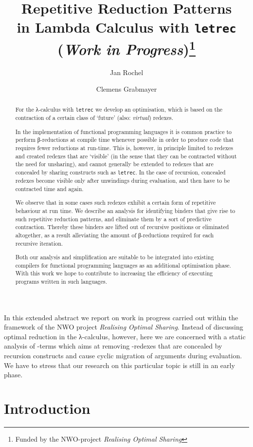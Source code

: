 \documentclass[submission,copyright,creativecommons]{eptcs}
\title{Repetitive Reduction Patterns\\ in Lambda Calculus with {\tt letrec}\\
       ({\it Work in Progress})\thanks{Funded by the NWO-project \emph{Realising Optimal Sharing}}}
\author{
  Jan Rochel
    \institute{Utrecht University\\ Utrecht, The Netherlands}
    \institute{Department of Information and Computing Sciences\\
               Information and Software Systems}
    \email{J.Rochel@cs.uu.nl}
\and
  Clemens Grabmayer
    \institute{Utrecht University\\Utrecht, The Netherlands}
    \institute{Department of Philosophy\\
               Theoretical Philosophy}
    \email{Clemens.Grabmayer@phil.uu.nl}
}
\newcommand{\nbd}{\nobreakdash}
\renewcommand\;{\,}
\begin{document}
\maketitle

\begin{abstract}
For the λ-calculus with \texttt{letrec} we develop an optimisation, which
is based on the contraction of a certain class of `future' (also: \emph{virtual})
redexes.

In the implementation of functional programming languages it is common practice
to perform β\nbd-reductions at compile time whenever possible in order to produce
code that requires fewer reductions at run-time. This is, however, in principle
limited to redexes and created redexes that are `visible' (in the sense that
they can be contracted without the need for unsharing), and cannot generally be
extended to redexes that are concealed by sharing constructs such as
\texttt{letrec}. 
In the case of recursion, concealed redexes become visible only after
unwindings during evaluation, and then have to be contracted time and again.

We observe that in some cases such redexes exhibit a certain form of repetitive
behaviour at run time.
We describe an analysis for identifying binders that give rise to such
repetitive reduction patterns, and eliminate them by a sort of predictive
contraction.
Thereby these binders are lifted out of recursive positions or eliminated altogether,
as a result alleviating the amount of β\nbd-reductions required for each recursive iteration. 

Both our analysis and simplification are suitable to be integrated into existing
compilers for functional programming languages as an additional optimisation phase.
With this work we hope to contribute to increasing the efficiency of executing
programs written in such languages.
\end{abstract}

In this extended abstract we report on work in progress carried out within the
framework of the NWO project \emph{Realising Optimal Sharing}. Instead of
discussing optimal reduction in the λ\nbd-calculus, however, here we are concerned
with a static analysis of -terms which aims at
removing \nbd-redexes that are concealed by recursion constructs and
cause cyclic migration of arguments during evaluation. We have to stress that
our research on this particular topic is still in an early phase. 



\section{Introduction}\label{sec:intro}
\end{document}
